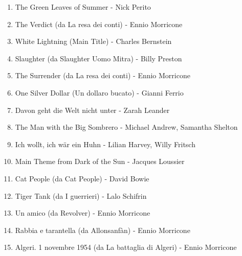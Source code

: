 \documentclass[12pt]{article} %
\begin{document}
                    \begin{enumerate}
                        \item The Green Leaves of Summer - Nick Perito
                        \item The Verdict (da La resa dei conti) - Ennio Morricone
                        \item White Lightning (Main Title) - Charles Bernstein
                        \item Slaughter (da Slaughter Uomo Mitra) - Billy Preston
                        \item The Surrender (da La resa dei conti) - Ennio Morricone
                        \item One Silver Dollar (Un dollaro bucato) - Gianni Ferrio
                        \item Davon geht die Welt nicht unter - Zarah Leander
                        \item The Man with the Big Sombrero - Michael Andrew, Samantha Shelton
                        \item Ich wollt, ich wär ein Huhn - Lilian Harvey, Willy Fritsch
                        \item Main Theme from Dark of the Sun - Jacques Loussier
                        \item Cat People (da Cat People) - David Bowie
                        \item Tiger Tank (da I guerrieri) - Lalo Schifrin
                        \item Un amico (da Revolver) - Ennio Morricone
                        \item Rabbia e tarantella  (da Allonsanfàn) - Ennio Morricone
                        \item Algeri. 1 novembre 1954 (da La battaglia di Algeri) - Ennio Morricone
                    \end{enumerate}

                    \normalsize
\end{document}
